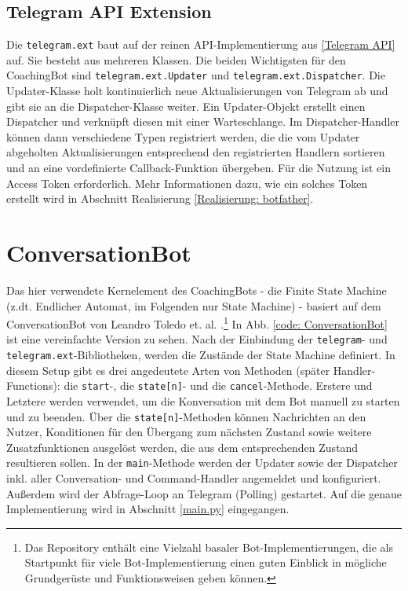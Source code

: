         \subsection{Telegram API Extension}\label{Telegram API Ext}
            Die \verb|telegram.ext| baut auf der reinen API-Implementierung aus \ref{Telegram API} auf. Sie besteht aus mehreren Klassen. Die beiden Wichtigsten für den CoachingBot sind \verb|telegram.ext.Updater| und \verb|telegram.ext.Dispatcher|. Die Updater-Klasse holt kontinuierlich neue Aktualisierungen von Telegram ab und gibt sie an die Dispatcher-Klasse weiter. Ein Updater-Objekt erstellt einen Dispatcher und verknüpft diesen mit einer Warteschlange. Im Dispatcher-Handler können dann verschiedene Typen registriert werden, die die vom Updater abgeholten Aktualisierungen entsprechend den registrierten Handlern sortieren und an eine vordefinierte Callback-Funktion übergeben. Für die Nutzung ist ein Access Token erforderlich.\cite{telegram_ext_intro} Mehr Informationen dazu, wie ein solches Token erstellt wird in Abschnitt Realisierung \ref{Realisierung: botfather}.


    \section{ConversationBot}
        Das hier verwendete Kernelement des CoachingBots - die Finite State Machine (z.dt. Endlicher Automat, im Folgenden nur \glqq State Machine\grqq) - basiert auf dem ConversationBot von Leandro Toledo et. al. \cite{conversationBot}.\footnote{Das Repository enthält eine Vielzahl basaler Bot-Implementierungen, die als Startpunkt für viele Bot-Implementierung einen guten Einblick in mögliche Grundgerüste und Funktionsweisen geben können.} In Abb. \ref{code: ConversationBot} ist eine vereinfachte Version zu sehen. Nach der Einbindung der \verb|telegram|- und \verb|telegram.ext|-Bibliotheken, werden die Zustände der State Machine definiert. In diesem Setup gibt es drei angedeutete Arten von Methoden (später Handler-Functions): die \verb|start|-, die \verb|state[n]|- und die \verb|cancel|-Methode. Erstere und Letztere werden verwendet, um die Konversation mit dem Bot manuell zu starten und zu beenden. Über die \verb|state[n]|-Methoden können Nachrichten an den Nutzer, Konditionen für den Übergang zum nächsten Zustand sowie weitere Zusatzfunktionen ausgelöst werden, die aus dem entsprechenden Zustand resultieren sollen. 
        In der \verb|main|-Methode werden der Updater sowie der Dispatcher inkl. aller Conversation- und Command-Handler angemeldet und konfiguriert. Außerdem wird der Abfrage-Loop an Telegram (Polling) gestartet. Auf die genaue Implementierung wird in Abschnitt \ref{main.py} eingegangen.
        
